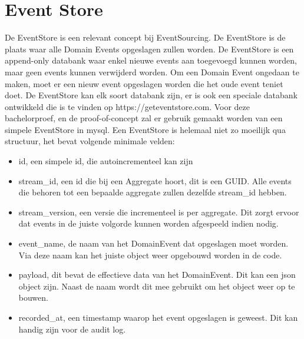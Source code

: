 
\section{Event Store}
\label{sec:event-store}

De EventStore is een relevant concept bij EventSourcing. De EventStore is de plaats waar alle Domain Events opgeslagen zullen worden. De EventStore is een append-only databank waar enkel nieuwe events aan toegevoegd kunnen worden, maar geen events kunnen verwijderd worden. Om een Domain Event ongedaan te maken, moet er een nieuw event opgeslagen worden die het oude event teniet doet. De EventStore kan elk soort databank zijn, er is ook een speciale databank ontwikkeld die is te vinden op https://geteventstore.com. Voor deze bachelorproef, en de proof-of-concept zal er gebruik gemaakt worden van een simpele EventStore in \gls{mysql}. Een EventStore is helemaal niet zo moeilijk qua structuur, het bevat volgende minimale velden:

\begin{itemize}
  \item{id, een simpele id, die autoincrementeel kan zijn}
  \item{stream_id, een id die bij een Aggregate hoort, dit is een \gls{GUID}. Alle events die behoren tot een bepaalde aggregate zullen dezelfde stream_id hebben.}
  \item{stream_version, een versie die incrementeel is per aggregate. Dit zorgt ervoor dat events in de juiste volgorde kunnen worden afgespeeld indien nodig.}
  \item{event_name, de naam van het DomainEvent dat opgeslagen moet worden. Via deze naam kan het juiste object weer opgebouwd worden in de code.}
  \item{payload, dit bevat de effectieve data van het DomainEvent. Dit kan een \gls{json} object zijn. Naast de naam wordt dit mee gebruikt om het object weer op te bouwen.}
  \item{recorded_at, een timestamp waarop het event opgeslagen is geweest. Dit kan handig zijn voor de audit log.}
\end{itemize}
